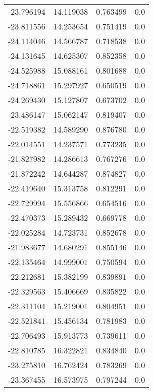 \begin{tabular}{rrrr}
      -23.796194 &        14.119038 &    0.763499 &   0.0 \\
      -23.811556 &        14.253654 &    0.751419 &   0.0 \\
      -24.114046 &        14.566787 &    0.718538 &   0.0 \\
      -24.131645 &        14.625307 &    0.852358 &   0.0 \\
      -24.525988 &        15.088161 &    0.801688 &   0.0 \\
      -24.718861 &        15.297927 &    0.650519 &   0.0 \\
      -24.269430 &        15.127807 &    0.673702 &   0.0 \\
      -23.486147 &        15.062147 &    0.819407 &   0.0 \\
      -22.519382 &        14.589290 &    0.876780 &   0.0 \\
      -22.014551 &        14.237571 &    0.773235 &   0.0 \\
      -21.827982 &        14.286613 &    0.767276 &   0.0 \\
      -21.872242 &        14.644287 &    0.874827 &   0.0 \\
      -22.419640 &        15.313758 &    0.812291 &   0.0 \\
      -22.729994 &        15.556866 &    0.654516 &   0.0 \\
      -22.470373 &        15.289432 &    0.669778 &   0.0 \\
      -22.025284 &        14.723731 &    0.852678 &   0.0 \\
      -21.983677 &        14.680291 &    0.855146 &   0.0 \\
      -22.135464 &        14.999001 &    0.750594 &   0.0 \\
      -22.212681 &        15.382199 &    0.839891 &   0.0 \\
      -22.329563 &        15.406669 &    0.835822 &   0.0 \\
      -22.311104 &        15.219001 &    0.804951 &   0.0 \\
      -22.521841 &        15.456134 &    0.781983 &   0.0 \\
      -22.706493 &        15.913773 &    0.739611 &   0.0 \\
      -22.810785 &        16.322821 &    0.834840 &   0.0 \\
      -23.275810 &        16.762424 &    0.783269 &   0.0 \\
      -23.367455 &        16.573975 &    0.797244 &   0.0 \\

\end{tabular}
